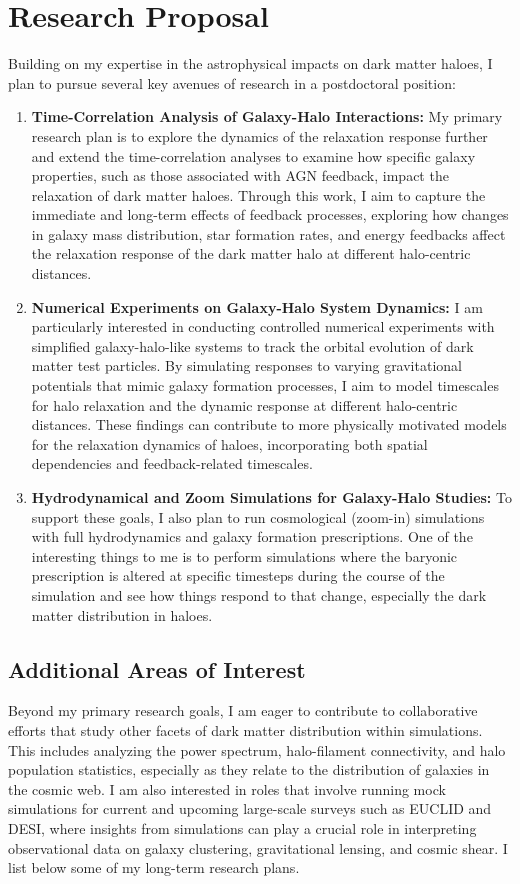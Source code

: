 \documentclass[12pt]{article}
\begin{document}
\section{Research Proposal}
Building on my expertise in the astrophysical impacts on dark matter haloes, I plan to pursue several key avenues of research in a postdoctoral position:

\begin{enumerate}
    \item \textbf{Time-Correlation Analysis of Galaxy-Halo Interactions:} My primary research plan is to explore the dynamics of the relaxation response further and extend the time-correlation analyses to examine how specific galaxy properties, such as those associated with AGN feedback, impact the relaxation of dark matter haloes. Through this work, I aim to capture the immediate and long-term effects of feedback processes, exploring how changes in galaxy mass distribution, star formation rates, and energy feedbacks affect the relaxation response of the dark matter halo at different halo-centric distances.

    \item \textbf{Numerical Experiments on Galaxy-Halo System Dynamics:} I am particularly interested in conducting controlled numerical experiments with simplified galaxy-halo-like systems to track the orbital evolution of dark matter test particles. By simulating responses to varying gravitational potentials that mimic galaxy formation processes, I aim to model timescales for halo relaxation and the dynamic response at different halo-centric distances. These findings can contribute to more physically motivated models for the relaxation dynamics of haloes, incorporating both spatial dependencies and feedback-related timescales.

    \item \textbf{Hydrodynamical and Zoom Simulations for Galaxy-Halo Studies:} To support these goals, I also plan to run cosmological (zoom-in) simulations with full hydrodynamics and galaxy formation prescriptions. One of the interesting things to me is to perform simulations where the baryonic prescription is altered at specific timesteps during the course of the simulation and see how things respond to that change, especially the dark matter distribution in haloes.
\end{enumerate}

\subsection{Additional Areas of Interest}
Beyond my primary research goals, I am eager to contribute to collaborative efforts that study other facets of dark matter distribution within simulations. This includes analyzing the power spectrum, halo-filament connectivity, and halo population statistics, especially as they relate to the distribution of galaxies in the cosmic web. I am also interested in roles that involve running mock simulations for current and upcoming large-scale surveys such as EUCLID and DESI, where insights from simulations can play a crucial role in interpreting observational data on galaxy clustering, gravitational lensing, and cosmic shear. I list below some of my long-term research plans.
\end{document}
